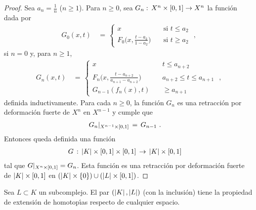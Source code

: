 \begin{proof}
	Sea $a_{n}=\frac{1}{n}$ ($n\geq 1$). Para $n\geq 0$, sea
	$G_{n}:\,X^{n}\times\left[0,1\right]\rightarrow X^{n}$ la funci\'{o}n
	dada por
	\begin{align*}
		G_{0}(x,t) & \,=\,
			\begin{cases}
				x &\quad\text{si }t\leq a_{2} \\
				F_{0}\big(x,\frac{t-a_{2}}{1-a_{2}}\big) &
					\quad\text{si }t\geq a_{2}
			\end{cases}
		\text{ ,}
	\end{align*}
	si $n=0$ y, para $n\geq 1$,
	\begin{align*}
		G_{n}(x,t) & \,=\,
			\begin{cases}
				x & \quad t\leq a_{n+2} \\[10pt]
				F_{n}\big(x,\frac{t-a_{n+2}}{a_{n+1}-a_{n+2}}
					\big) & \quad
				a_{n+2}\leq t\leq a_{n+1} \\[10pt]
				G_{n-1}(f_{n}(x),t) & \quad\geq a_{n+1}
			\end{cases}
		\text{ ,}
	\end{align*}
	definida inductivamente. Para cada $n\geq 0$, la funci\'{o}n
	$G_{n}$ es una retracci\'{o}n por deformaci\'{o}n fuerte de $X^{n}$
	en $X^{n-1}$ y cumple que
	\begin{align*}
		G_{n}|_{X^{n-1}\times\left[0,1\right]} & \,=\,G_{n-1}
		\text{ .}
	\end{align*}
	Entonces queda definida una funci\'{o}n
	\begin{align*}
		& G\,:\,\left|K\right|\times\left[0,1\right]\times\left[0,1\right]
			\,\rightarrow\,\left|K\right|\times\left[0,1\right]
	\end{align*}
	tal que $G|_{X^{n}\times\left[0,1\right]}=G_{n}$. Esta funci\'{o}n es una
	retracci\'{o}n por deformaci\'{o}n fuerte de $\left|K\right|\times\left[0,1\right]$
	en $(\left|K\right|\times\{0\})\cup(\left|L\right|\times\left[0,1\right])$.
\end{proof}

\begin{coroExtensionDeHomotopiasEnSubcomplejos}%
	\label{thm:extensiondehomotopiasensubcomplejos}
	Sea $L\subset K$ un subcomplejo. El par $(\left|K\right|,\left|L\right|)$
	(con la inclusi\'{o}n) tiene la propiedad de extensi\'{o}n de
	homotop\'{\i}as respecto de cualquier espacio.
\end{coroExtensionDeHomotopiasEnSubcomplejos}


